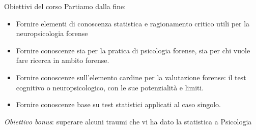 \documentclass[
  ignorenonframetext,
]{beamer}
\providecommand{\tightlist}{%
  \setlength{\itemsep}{0pt}\setlength{\parskip}{0pt}}
\begin{document}
\begin{frame}{Obiettivi del corso}
\label{obiettivi-del-corso}
Partiamo dalla fine:

\begin{itemize}
\tightlist
\item
  Fornire elementi di conoscenza statistica e ragionamento critico utili
  per la neuropsicologia forense
\item
  Fornire conoscenze sia per la pratica di psicologia forense, sia per
  chi vuole fare ricerca in ambito forense.
\item
  Fornire conoscenze sull'elemento cardine per la valutazione forense:
  il test cognitivo o neuropsicologico, con le sue potenzialità e
  limiti.
\item
  Fornire conoscenze base su test statistici applicati al caso singolo.
\end{itemize}

\pause

\emph{Obiettivo bonus}: superare alcuni traumi che vi ha dato la
statistica a Psicologia
\end{frame}
\end{document}
